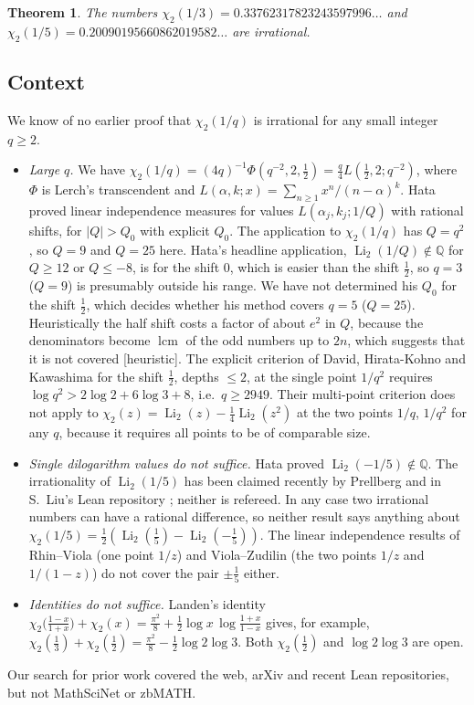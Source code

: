 \documentclass[11pt]{amsart}
\newtheorem{theorem}{Theorem}[section]
\theoremstyle{definition}
\theoremstyle{remark}
\numberwithin{equation}{section}
\newcommand{\QQ}{\mathbb{Q}}
\newcommand{\Li}{\operatorname{Li}}
\begin{document}
\begin{theorem}\label{thm:main}
The numbers $\chi_2(1/3)=0.33762317823243597996\ldots$ and $\chi_2(1/5)=0.20090195660862019582\ldots$ are
irrational.
\end{theorem}

\subsection{Context}
We know of no earlier proof that $\chi_2(1/q)$ is irrational for any small integer $q\ge2$.
\begin{itemize}
\item \emph{Large $q$.} We have $\chi_2(1/q)=(4q)^{-1}\Phi(q^{-2},2,\tfrac12)=\frac q4L(\tfrac12,2;q^{-2})$, where
  $\Phi$ is Lerch's transcendent and $L(\alpha,k;x)=\sum_{n\ge1}x^n/(n-\alpha)^k$. Hata \cite{Hata1990} proved
  linear independence measures for values $L(\alpha_j,k_j;1/Q)$ with rational shifts, for $|Q|>Q_0$ with explicit $Q_0$.
  The application to $\chi_2(1/q)$ has $Q=q^2$, so $Q=9$ and $Q=25$ here. Hata's headline application,
  $\Li_2(1/Q)\notin\QQ$ for $Q\ge12$ or $Q\le-8$, is for the shift $0$, which is easier than the shift $\frac12$,
  so $q=3$ ($Q=9$) is presumably outside his range. We have not determined his $Q_0$ for the shift $\frac12$, which
  decides whether his method covers $q=5$ ($Q=25$).
  Heuristically the half shift costs a factor of about $e^2$ in $Q$, because the denominators become
  $\operatorname{lcm}$ of the odd numbers up to $2n$, which suggests that it is not covered [heuristic]. The explicit
  criterion of David, Hirata-Kohno and Kawashima \cite[Thm.~2.1]{DHK2022} for the shift $\frac12$, depths $\le2$, at the
  single point $1/q^2$ requires $\log q^2>2\log2+6\log3+8$, i.e.\ $q\ge2949$. Their multi-point criterion
  \cite[Thm.~2.1]{DHK2020} does not apply to $\chi_2(z)=\Li_2(z)-\frac14\Li_2(z^2)$ at the two points $1/q$, $1/q^2$ for
  any $q$, because it requires all points to be of comparable size.
\item \emph{Single dilogarithm values do not suffice.} Hata \cite{Hata1993} proved $\Li_2(-1/5)\notin\QQ$. The
  irrationality of $\Li_2(1/5)$ has been claimed recently by Prellberg \cite{Prellberg2026} and in S.~Liu's Lean
  repository \cite{LiuLi2}; neither is refereed. In any case two irrational numbers can have a rational
  difference, so neither result says anything about $\chi_2(1/5)=\frac12(\Li_2(\frac15)-\Li_2(-\frac15))$. The
  linear independence results of Rhin--Viola \cite{RhinViola2005} (one point $1/z$) and Viola--Zudilin
  \cite{ViolaZudilin2018} (the two points $1/z$ and $1/(1-z)$) do not cover the pair $\pm\frac15$ either.
\item \emph{Identities do not suffice.} Landen's identity \cite[App.~A.2.1, (24)]{Lewin1981}
  $\chi_2\bigl(\tfrac{1-x}{1+x}\bigr)+\chi_2(x)=\tfrac{\pi^2}{8}+\tfrac12\log x\,\log\tfrac{1+x}{1-x}$ gives, for
  example, $\chi_2(\frac13)+\chi_2(\frac12)=\frac{\pi^2}8-\frac12\log2\log3$. Both $\chi_2(\frac12)$ and $\log2\log3$
  are open.
\end{itemize}
Our search for prior work covered the web, arXiv and recent Lean repositories, but not MathSciNet or zbMATH.
\end{document}
